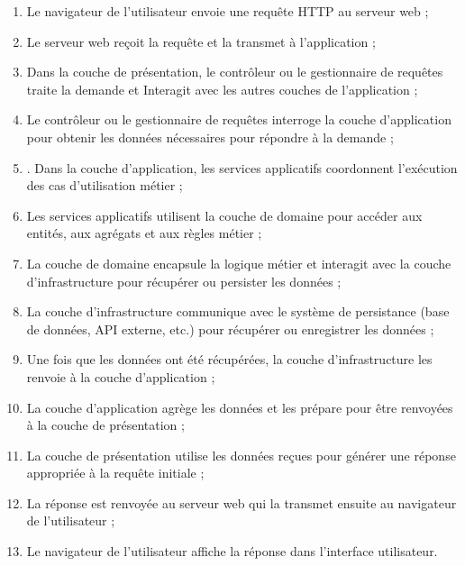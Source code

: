 \begin{enumerate}
    \item Le navigateur de l'utilisateur envoie une requête HTTP au serveur web ;

\item Le serveur web reçoit la requête et la transmet à l'application ;

\item Dans la couche de présentation, le contrôleur ou le gestionnaire de requêtes traite la demande et Interagit avec les autres couches de l'application ;

\item Le contrôleur ou le gestionnaire de requêtes interroge la couche d'application pour obtenir les données nécessaires pour répondre à la demande ;
\item. Dans la couche d'application, les services applicatifs coordonnent l'exécution des cas d'utilisation métier ;

\item Les services applicatifs utilisent la couche de domaine pour accéder aux entités, aux agrégats et aux règles métier ;

\item La couche de domaine encapsule la logique métier et interagit avec la couche d'infrastructure pour récupérer ou persister les données ;

\item La couche d'infrastructure communique avec le système de persistance (base de données, API externe, etc.) pour récupérer ou enregistrer les données ;

\item Une fois que les données ont été récupérées, la couche d'infrastructure les renvoie à la couche d'application ;

\item La couche d'application agrège les données et les prépare pour être renvoyées à la couche de présentation ;

\item La couche de présentation utilise les données reçues pour générer une réponse appropriée à la requête initiale ;
\item La réponse est renvoyée au serveur web qui la transmet ensuite au navigateur de l'utilisateur ;

\item Le navigateur de l'utilisateur affiche la réponse dans l'interface utilisateur.
\end{enumerate}


